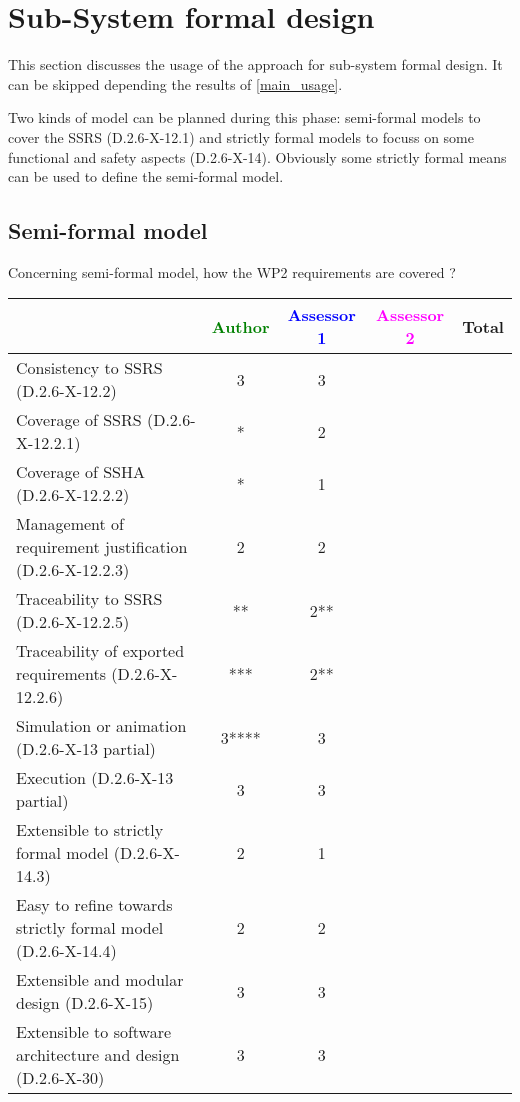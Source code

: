 \section{Sub-System formal design}
This section discusses the usage of the approach for sub-system formal design.
It can be skipped depending the results of \ref{main_usage}.

Two kinds of model can be planned during this phase: semi-formal models to cover the SSRS (D.2.6-X-12.1) and strictly formal models to focuss on some functional and safety aspects (D.2.6-X-14). Obviously some strictly formal means can be used to define the semi-formal model.

\subsection{Semi-formal model}

Concerning semi-formal model, how the WP2 requirements are covered ?

\begin{tabular}{|l | c | c | c | c|}
\hline
& \textcolor{green}{Author} & \textcolor{blue}{Assessor 1} & \textcolor{magenta}{Assessor 2} & Total \\
\hline
Consistency to SSRS (D.2.6-X-12.2) &3 &3 & & \\
\hline
Coverage of SSRS (D.2.6-X-12.2.1) &* &2 & & \\
\hline
Coverage of SSHA (D.2.6-X-12.2.2) &* &1 & & \\
\hline
Management of requirement justification (D.2.6-X-12.2.3) &2 &2 & & \\
\hline
Traceability to SSRS (D.2.6-X-12.2.5) &** &2** & & \\
\hline
Traceability of exported requirements (D.2.6-X-12.2.6) &*** & 2**& & \\
\hline
Simulation or animation (D.2.6-X-13 partial) &3**** & 3 & & \\
\hline
Execution (D.2.6-X-13 partial) &3 &3 & & \\
\hline
Extensible to strictly formal model (D.2.6-X-14.3) &2 &1 & & \\
\hline
Easy to refine towards strictly formal model (D.2.6-X-14.4) &2 &2 & & \\
\hline
Extensible and modular design (D.2.6-X-15) &3 &3 & & \\
\hline
Extensible to software architecture and design (D.2.6-X-30) &3 &3 & & \\
\hline
\end{tabular}

